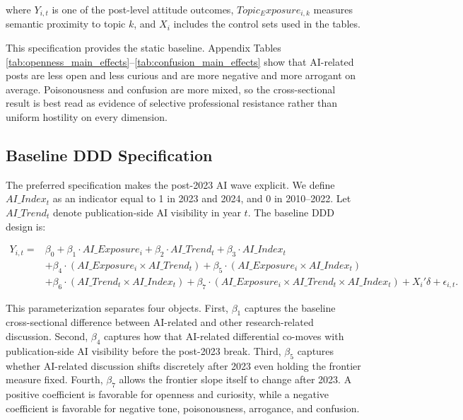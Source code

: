 \documentclass[11pt]{article}
\begin{document}
where $Y_{i,t}$ is one of the post-level attitude outcomes, $Topic_Exposure_{i,k}$ measures semantic proximity to topic $k$, and $X_i$ includes the control sets used in the tables.

This specification provides the static baseline. Appendix Tables \ref{tab:openness_main_effects}--\ref{tab:confusion_main_effects} show that AI-related posts are less open and less curious and are more negative and more arrogant on average. Poisonousness and confusion are more mixed, so the cross-sectional result is best read as evidence of selective professional resistance rather than uniform hostility on every dimension.

\subsection{Baseline DDD Specification}

The preferred specification makes the post-2023 AI wave explicit. We define $AI\_Index_t$ as an indicator equal to 1 in 2023 and 2024, and 0 in 2010--2022. Let $AI\_Trend_t$ denote publication-side AI visibility in year $t$. The baseline DDD design is:

\begin{equation}
\begin{aligned}
Y_{i,t} ={}& \beta_0 + \beta_1 \cdot AI\_Exposure_i + \beta_2 \cdot AI\_Trend_t + \beta_3 \cdot AI\_Index_t \\
&+ \beta_4 \cdot \left(AI\_Exposure_i \times AI\_Trend_t\right)
+ \beta_5 \cdot \left(AI\_Exposure_i \times AI\_Index_t\right) \\
&+ \beta_6 \cdot \left(AI\_Trend_t \times AI\_Index_t\right)
+ \beta_7 \cdot \left(AI\_Exposure_i \times AI\_Trend_t \times AI\_Index_t\right)
+ X_i' \delta + \epsilon_{i,t}.
\end{aligned}
\end{equation}

This parameterization separates four objects. First, $\beta_1$ captures the baseline cross-sectional difference between AI-related and other research-related discussion. Second, $\beta_4$ captures how that AI-related differential co-moves with publication-side AI visibility before the post-2023 break. Third, $\beta_5$ captures whether AI-related discussion shifts discretely after 2023 even holding the frontier measure fixed. Fourth, $\beta_7$ allows the frontier slope itself to change after 2023. A positive coefficient is favorable for openness and curiosity, while a negative coefficient is favorable for negative tone, poisonousness, arrogance, and confusion.
\end{document}
